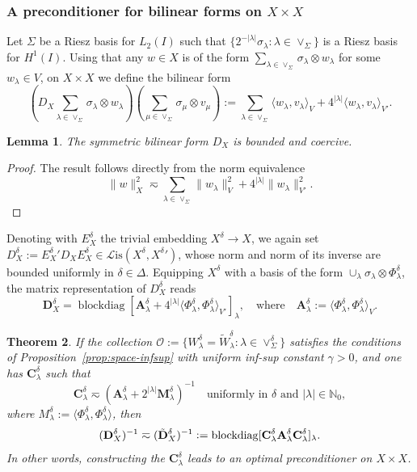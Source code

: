 \documentclass[11pt,a4paper,oneside,english]{amsart}
\numberwithin{equation}{section}
\newtheorem{theorem}{Theorem}
\numberwithin{theorem}{section}
\newtheorem{lemma}[theorem]{Lemma}
\theoremstyle{definition}
\newcommand{\N}{\mathbb{N}}
\DeclareMathOperator{\blockdiag}{blockdiag}
\newcommand{\la}{\langle}
\newcommand{\ra}{\rangle}
\newcommand{\cL}{\mathcal L}
\newcommand{\Lis}{\cL\mathrm{is}}
\newcommand{\jw}[1]{{\color{red}{JW: #1}}}
\begin{document}
\subsubsection{A preconditioner for bilinear forms on $X \times X$}
Let $\Sigma$ be a Riesz basis for $L_2(I)$ such that
$\{2^{-|\lambda|}\sigma_\lambda : \lambda \in \vee_\Sigma\}$ is a Riesz basis for $H^1(I)$.
Using that any $w \in X$ is of the form $\sum_{\lambda \in \vee_\Sigma} \sigma_\lambda \otimes w_\lambda$ for some $w_\lambda \in V$,
on $X \times X$ we define the bilinear form
\[
  (D_X \sum_{\lambda \in \vee_{\Sigma}} \sigma_\lambda \otimes w_\lambda)(\sum_{\mu \in \vee_{\Sigma}} \sigma_\mu \otimes v_\mu) := \sum_{\lambda \in \vee_\Sigma} \la w_\lambda, v_\lambda \ra_V + 4^{|\lambda|} \la w_\lambda, v_\lambda \ra_{V'}.
\]
\begin{lemma}
  The symmetric bilinear form $D_X$ is bounded and coercive.
\end{lemma}
\begin{proof}
  The result follows directly from the norm equivalence
  \[
    \|w\|_X^2 \eqsim \sum_{\lambda \in \vee_\Sigma} \|w_\lambda\|_V^2 + 4^{|\lambda|} \|w_\lambda\|_{V'}^2.
  \]
  \jw{TODO prove; hier kwamen we vorige keer niet netjes uit.}
\end{proof}
Denoting with $E_X^\delta$ the trivial embedding $X^\delta \to X$, we again set
$D_X^\delta := {E_X^\delta}' D_X E_X^\delta \in \Lis(X^\delta, {X^\delta}')$, whose
norm and norm of its inverse are bounded uniformly in $\delta \in \Delta$. Equipping
$X^\delta$ with a basis of the form $\cup_\lambda \sigma_\lambda \otimes \Phi_\lambda^\delta$,
the matrix representation of $D_X^\delta$ reads
\[
  \mathbf D_X^\delta = \blockdiag[\mathbf A_\lambda^\delta + 4^{|\lambda|} \la \Phi_\lambda^\delta, \Phi_\lambda^\delta \ra_{V'}]_\lambda, \quad \text{where} \quad \mathbf A_\lambda^\delta := \la \Phi_\lambda^\delta, \Phi_\lambda^\delta \ra_V.
\]
\begin{theorem}
  \label{thm:DX-precond}
  If the collection $\mathcal O := \{W_\lambda^\delta = \tilde W_\lambda^\delta : \lambda \in \vee_\Sigma^\delta\}$
  satisfies the conditions of Proposition~\ref{prop:space-infsup} with uniform inf-sup constant $\gamma>0$, and one has $\mathbf C_\lambda^\delta$ such that
  \begin{equation}\label{eqn:robustmg}
      \mathbf C_\lambda^\delta \eqsim (\mathbf A_\lambda^\delta + 2^{|\lambda|} \mathbf M_\lambda^\delta)^{-1} \quad \text{uniformly in $\delta$ and $|\lambda|\in \N_0$},
  \end{equation}
  where $M_\lambda^\delta := \la \Phi_\lambda^\delta, \Phi_\lambda^\delta \ra$, then
  \[
    (\mathbf D_X^\delta)^{-1} \eqsim (\tilde {\bf D}_X^{\delta})^{-1} := \blockdiag[\mathbf C_\lambda^\delta \mathbf A_\lambda^\delta \mathbf C_\lambda^\delta]_\lambda.
  \]
  In other words, constructing the $\mathbf C_\lambda^\delta$ leads to an optimal preconditioner on $X \times X$.
\end{theorem}
\end{document}
